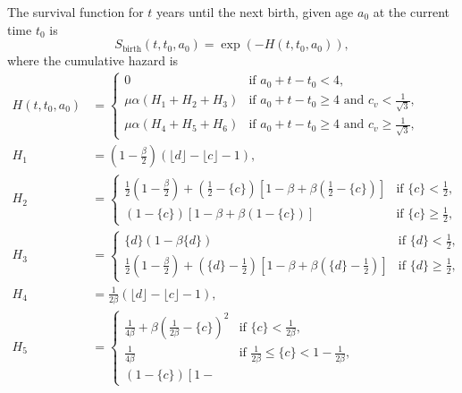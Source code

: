 \documentclass{article}
\begin{document}
The survival function for $t$ years until the next birth, given age
$a_0$ at the current time $t_0$ is
\begin{equation}
  S_{\text{birth}}(t, t_0, a_0) = \exp\left(- H(t, t_0, a_0)\right),
\end{equation}
where the cumulative hazard is
\begin{align}
  H(t, t_0, a_0) &=
  \begin{cases}
    0 & \text{if $a_0 + t - t_0 < 4$},
    \\
    \mu \alpha \left(H_1 + H_2  + H_3\right)
    & \text{if $a_0 + t - t_0 \geq 4$ and $c_v < \frac{1}{\sqrt{3}}$},
    \\
    \mu \alpha \left(H_4 + H_5 + H_6\right)
    & \text{if $a_0 + t - t_0 \geq 4$ and $c_v \geq \frac{1}{\sqrt{3}}$},
  \end{cases}
  \\
  H_1 &= \left(1 - \frac{\beta}{2}\right)
  \left(\lfloor d \rfloor - \lfloor c \rfloor - 1\right),
  \\
  H_2 &=
  \begin{cases}
    \frac{1}{2} \left(1 - \frac{\beta}{2}\right)
    + \left(\frac{1}{2} - \{c\}\right)
    \left[1 - \beta
      + \beta \left(\frac{1}{2} - \{c\}\right)\right]
    & \text{if $\{c\} < \frac{1}{2}$},
    \\
    \left(1 - \{c\}\right)
    \left[1 - \beta + \beta \left(1 - \{c\}\right)\right]
    & \text{if $\{c\} \geq \frac{1}{2}$},
  \end{cases}
  \\
  H_3 &=
  \begin{cases}
    \{d\}\left(1 - \beta \{d\}\right)
    & \text{if $\{d\} < \frac{1}{2}$},
    \\
    \frac{1}{2} \left(1 - \frac{\beta}{2}\right)
    + \left(\{d\} - \frac{1}{2}\right)
    \left[1 - \beta
      + \beta \left(\{d\} - \frac{1}{2}\right)\right]
    & \text{if $\{d\} \geq \frac{1}{2}$},
    \end{cases}
  \\
  H_4 &= \frac{1}{2 \beta}
  \left(\lfloor d \rfloor - \lfloor c \rfloor - 1\right),
  \\
  H_5 &=
  \begin{cases}
    \frac{1}{4 \beta}
    + \beta \left(\frac{1}{2 \beta} - \{c\}\right)^2
    & \text{if $\{c\} < \frac{1}{2 \beta}$},
    \\
    \frac{1}{4 \beta}
    & \text{if $\frac{1}{2 \beta} \leq \{c\} < 1 - \frac{1}{2 \beta}$},
    \\
    \left(1 - \{c\}\right) \left[1 -

\end{cases}
\end{align}
\end{document}
